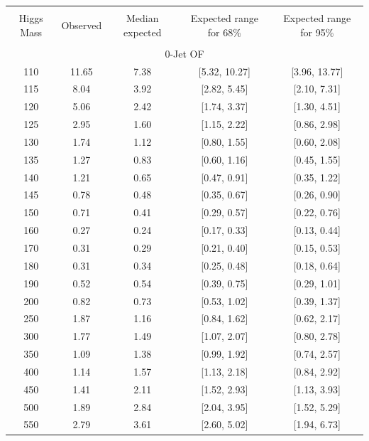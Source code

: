 \begin{table}[hbp!]
\begin{center}
\begin{tabular}{c c c c c}
\hline
\vspace{-3mm} && \\
 Higgs Mass & Observed  & Median expected & Expected range for 68\% & Expected range for 95\%   \\
\vspace{-3mm} && \\
\hline
\multicolumn{5}{c}{0-Jet OF} \\
\hline
110 & 11.65 & 7.38 & [5.32, 10.27] & [3.96, 13.77] \\
115 & 8.04 & 3.92 & [2.82, 5.45] & [2.10, 7.31] \\
120 & 5.06 & 2.42 & [1.74, 3.37] & [1.30, 4.51] \\
125 & 2.95 & 1.60 & [1.15, 2.22] & [0.86, 2.98] \\
130 & 1.74 & 1.12 & [0.80, 1.55] & [0.60, 2.08] \\
135 & 1.27 & 0.83 & [0.60, 1.16] & [0.45, 1.55] \\
140 & 1.21 & 0.65 & [0.47, 0.91] & [0.35, 1.22] \\
145 & 0.78 & 0.48 & [0.35, 0.67] & [0.26, 0.90] \\
150 & 0.71 & 0.41 & [0.29, 0.57] & [0.22, 0.76] \\
160 & 0.27 & 0.24 & [0.17, 0.33] & [0.13, 0.44] \\
170 & 0.31 & 0.29 & [0.21, 0.40] & [0.15, 0.53] \\
180 & 0.31 & 0.34 & [0.25, 0.48] & [0.18, 0.64] \\
190 & 0.52 & 0.54 & [0.39, 0.75] & [0.29, 1.01] \\
200 & 0.82 & 0.73 & [0.53, 1.02] & [0.39, 1.37] \\
250 & 1.87 & 1.16 & [0.84, 1.62] & [0.62, 2.17] \\
300 & 1.77 & 1.49 & [1.07, 2.07] & [0.80, 2.78] \\
350 & 1.09 & 1.38 & [0.99, 1.92] & [0.74, 2.57] \\
400 & 1.14 & 1.57 & [1.13, 2.18] & [0.84, 2.92] \\
450 & 1.41 & 2.11 & [1.52, 2.93] & [1.13, 3.93] \\
500 & 1.89 & 2.84 & [2.04, 3.95] & [1.52, 5.29] \\
550 & 2.79 & 3.61 & [2.60, 5.02] & [1.94, 6.73] \\

\end{tabular}
\end{center}
\end{table}
